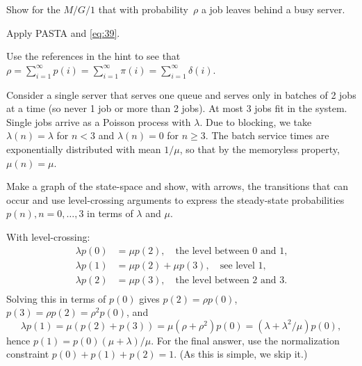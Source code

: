 \documentclass[stochastic-or.tex]{subfiles}
\begin{document}
\begin{exercise}\label{ex:28}
Show for the $M/G/1$  that  with probability~$\rho$ a job leaves behind a busy server.
\begin{hint}
 Apply PASTA and \cref{eq:39}.
\end{hint}
\begin{solution}
Use the references in  the hint to see that
$\rho = \sum_{i=1}^\infty p(i) = \sum_{i=1}^\infty \pi(i) = \sum_{i=1}^\infty \delta(i)$.
\end{solution}
\end{exercise}


\begin{exercise}\label{ex:67}
Consider a single server that serves one queue and serves only in batches of 2 jobs at a time (so never 1 job or more than 2 jobs).
At most 3 jobs fit in the system.
Single jobs arrive as a Poisson process with $\lambda$.
Due to blocking, we take $\lambda(n) = \lambda$ for $n<3$ and $\lambda(n)=0$ for $n\geq 3$.
The batch service times are exponentially distributed with mean $1/\mu$, so that by the memoryless property, $\mu(n) = \mu$.

Make a graph of the state-space and show, with arrows, the transitions that can occur and use level-crossing arguments to express the steady-state probabilities $p(n), n=0,\ldots, 3$ in terms of $\lambda$ and $\mu$.

\begin{solution}


With level-crossing:
 \begin{align*}
 \lambda p(0) &= \mu p(2), \quad\text{the level between 0 and 1,}\\
 \lambda p(1) &= \mu p(2) +\mu p(3), \quad\text{see level 1,}\\
 \lambda p(2) &= \mu p(3), \quad\text{the level between 2 and 3.}\\
 \end{align*}
 Solving this in terms of $p(0)$ gives $p(2) = \rho p(0)$, $p(3) = \rho p(2) = \rho^2p(0)$, and
 \begin{equation*}
 \lambda p(1) = \mu(p(2) + p(3)) = \mu (\rho + \rho^2) p(0) = (\lambda + \lambda^2/\mu) p(0),
 \end{equation*}
hence $p(1) = p(0)(\mu + \lambda)/\mu$. For the final answer, use the normalization constraint $p(0) + p(1) + p(2) = 1$. (As this is simple, we skip it.)
\end{solution}
\end{exercise}
\end{document}
